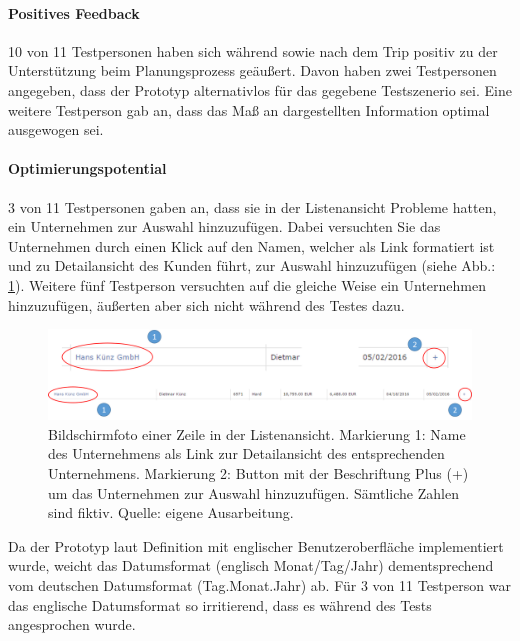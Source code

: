 \documentclass[Bachelorarbeit.tex]{subfiles}
\begin{document}
\paragraph{Positives Feedback}
10 von 11 Testpersonen haben sich während sowie nach dem Trip positiv zu der Unterstützung beim Planungsprozess geäußert. 
Davon haben zwei Testpersonen angegeben, dass der Prototyp alternativlos für das gegebene Testszenerio sei.  
Eine weitere Testperson gab an, dass das Maß an dargestellten Information optimal ausgewogen sei.

\paragraph{Optimierungspotential}
3 von 11 Testpersonen gaben an, dass sie in der Listenansicht Probleme hatten, ein Unternehmen zur Auswahl hinzuzufügen.
Dabei versuchten Sie das Unternehmen durch einen Klick auf den Namen, welcher als Link formatiert ist und zu Detailansicht des Kunden führt, zur Auswahl hinzuzufügen (siehe Abb.: \ref{fig:AddButton}).
Weitere fünf Testperson versuchten auf die gleiche Weise ein Unternehmen hinzuzufügen, äußerten aber sich nicht während des Testes dazu.

\begin{figure}[H]
	\centering
	\includegraphics[width=1\linewidth]{img/Evaluation/Userfeedback/AddButton}
	\caption[Auschnitt Listenansicht]{Bildschirmfoto einer Zeile in der Listenansicht. Markierung 1: Name des Unternehmens als Link zur Detailansicht des entsprechenden Unternehmens. Markierung 2: Button mit der Beschriftung Plus (+) um das Unternehmen zur Auswahl hinzuzufügen. Sämtliche Zahlen sind fiktiv. Quelle: eigene Ausarbeitung.}
	\label{fig:AddButton}
\end{figure}
Da der Prototyp laut Definition mit englischer Benutzeroberfläche implementiert wurde, weicht das Datumsformat (englisch Monat/Tag/Jahr) dementsprechend vom deutschen Datumsformat (Tag.Monat.Jahr) ab. 
Für 3 von 11 Testperson war das englische Datumsformat so irritierend, dass es während des Tests angesprochen wurde.
\end{document}
